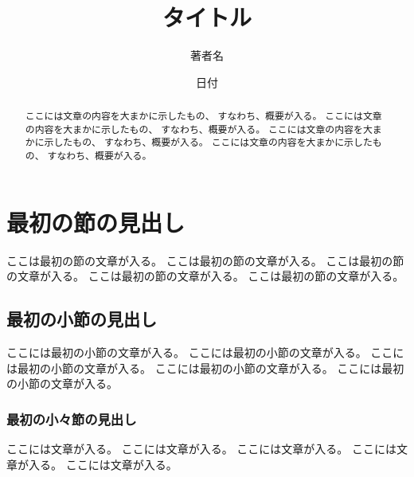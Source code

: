 \documentclass[ %
  uplatex,%
  papersize%
]{jsarticle}
\title{タイトル}
\author{著者名}
\date{日付}
\begin{document}
\maketitle

\begin{abstract}
ここには文章の内容を大まかに示したもの、
すなわち、概要が入る。
ここには文章の内容を大まかに示したもの、
すなわち、概要が入る。
ここには文章の内容を大まかに示したもの、
すなわち、概要が入る。
ここには文章の内容を大まかに示したもの、
すなわち、概要が入る。
\end{abstract}


\section{最初の節の見出し}

ここは最初の節の文章が入る。
ここは最初の節の文章が入る。
ここは最初の節の文章が入る。
ここは最初の節の文章が入る。
ここは最初の節の文章が入る。

\subsection{最初の小節の見出し}

ここには最初の小節の文章が入る。
ここには最初の小節の文章が入る。
ここには最初の小節の文章が入る。
ここには最初の小節の文章が入る。
ここには最初の小節の文章が入る。

\subsubsection{最初の小々節の見出し}

ここには文章が入る。
ここには文章が入る。
ここには文章が入る。
ここには文章が入る。
ここには文章が入る。
\end{document}
